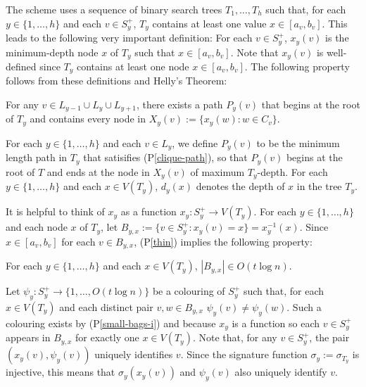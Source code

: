 \documentclass{patmorin}
\newcommand{\pref}[1]{(P\ref{#1})}
\begin{document}
The scheme uses a sequence of binary search trees $T_1,\ldots,T_h$ such that, for each $y\in\{1,\ldots,h\}$ and each $v\in S^+_y$, $T_y$ contains at least one value $x\in [a_v,b_v]$.  This leads to the following very important definition: For each $v\in S^+_y$, $x_{y}(v)$ is the minimum-depth node $x$ of $T_y$ such that $x\in [a_v,b_v]$. Note that $x_y(v)$ is well-defined since $T_y$ contains at least one node $x\in[a_v,b_v]$.   The following property follows from these definitions and Helly's Theorem:

\begin{compactenum}[(P1)]\setcounter{enumi}{1}
    \item For any $v\in L_{y-1}\cup L_y\cup L_{y+1}$, there exists a path $P_y(v)$ that begins at the root of $T_y$ and contains every node in $X_y(v):=\{x_{y}(w): w\in C_v\}$.\label{clique-path}
\end{compactenum}

For each $y\in\{1,\ldots,h\}$ and each $v\in L_y$, we define $P_y(v)$ to be the minimum length path in $T_y$ that satisifies \pref{clique-path}, so that $P_y(v)$ begins at the root of $T$ and ends at the node in $X_y(v)$ of maximum $T_y$-depth. For each $y\in\{1,\ldots,h\}$ and each $x\in V(T_y)$, $d_y(x)$ denotes the depth of $x$ in the tree $T_y$.

It is helpful to think of $x_y$ as a function $x_y:S^+_y\to V(T_y)$.  For each $y\in\{1,\ldots,h\}$ and each node $x$ of $T_y$, let $B_{y,x}:=\{v\in S^+_y: x_y(v)=x\}=x_y^{-1}(x)$.  Since $x\in[a_v,b_v]$ for each $v\in B_{y,x}$, \pref{thin} implies the following property:

\begin{compactenum}[(P1)]\setcounter{enumi}{2}
    \item For each $y\in\{1,\ldots,h\}$ and each $x\in V(T_y)$, $|B_{y,x}|\in O(t\log n)$. \label{small-bags-i}
\end{compactenum}

Let $\psi_y:S^+_y\to\{1,\ldots,O(t\log n)\}$ be a colouring of $S^+_y$ such that, for each $x\in V(T_y)$ and each distinct pair $v,w\in B_{y,x}$ $\psi_y(v)\neq\psi_y(w)$.  Such a colouring exists by \pref{small-bags-i} and because $x_y$ is a function so each $v\in S^+_y$ appears in $B_{y,x}$ for exactly one $x\in V(T_y)$.  Note that, for any $v\in S^+_y$, the pair $(x_y(v), \psi_y(v))$ uniquely identifies $v$.  Since the signature function $\sigma_y:=\sigma_{T_y}$ is injective, this means that $\sigma_y(x_y(v))$ and $\psi_y(v)$ also uniquely identify $v$.
\end{document}
